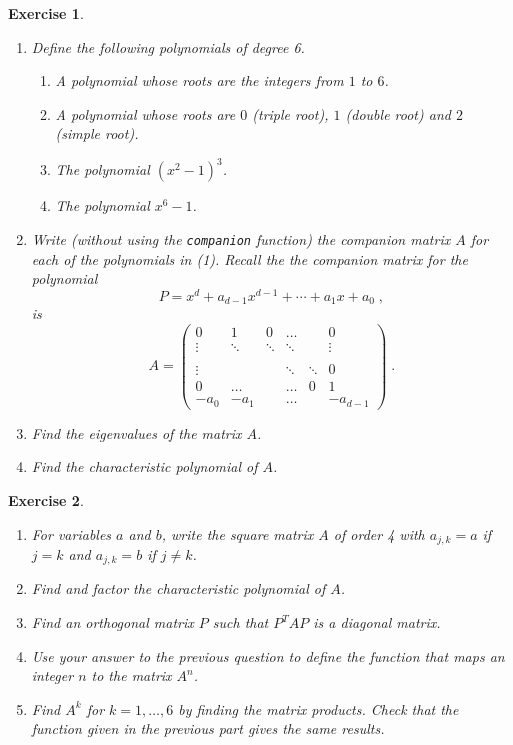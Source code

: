 \documentclass{article}
\newtheorem{exo}{Exercise}[section]
\begin{document}
\begin{exo}{\rm ~
\begin{enumerate}
\item
Define the following polynomials of degree 6.
\begin{enumerate}
\item
A polynomial whose roots are the integers from $1$ to $6$.
\item
A polynomial whose roots are $0$ (triple root), $1$
(double root) and $2$ (simple root).
\item
The polynomial $(x^2-1)^3$.
\item
The polynomial $x^6-1$.
\end{enumerate}
%

\item
Write (without using the \texttt{companion} function)
the companion  matrix $A$ for each of the polynomials in (1).
Recall the the companion matrix for the polynomial
\[
P=x^d+a_{d-1}x^{d-1}+\cdots+a_1x+a_0\;,
\]
is
\begin{equation}
\label{compagnon}
A = 
\left(
\begin{array}{cccccc}
0&1&0&\ldots&&0\\
\vdots&\ddots&\ddots&\ddots&&\vdots\\
&&&&&\\
\vdots&&&\ddots&\ddots&0\\
0&\ldots&&\ldots&0&1\\
-a_0&-a_1&&\ldots&&-a_{d-1}
\end{array}
\right)\;.
\end{equation} 
\item
Find the eigenvalues of the matrix $A$.
\item
Find the characteristic polynomial of $A$.
\end{enumerate} 
}\end{exo}
\begin{exo}{\rm ~
\begin{enumerate}
\item
For variables $a$ and $b$, write the square matrix $A$ of order 4 with
$a_{j,k}=a$ if $j=k$ and $a_{j,k}=b$ if $j \neq k$.
\item
Find and factor the characteristic polynomial of $A$.
\item
Find an orthogonal matrix $P$ such that ${P^T} A P$ is a diagonal
matrix. 
\item
Use your answer to the previous question to define the function that
maps an integer $n$ to the matrix $A^n$.
\item
Find $A^k$ for $k=1,\ldots,6$ by finding the matrix products.  Check
that the function given in the previous part gives the same results.
\end{enumerate} 
}\end{exo}
\end{document}
